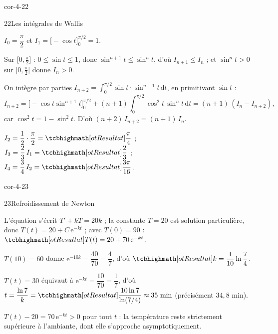 \begin{blocLivre}{cor-4-22}
\begin{corrige}{22}{Les intégrales de Wallis}
\begin{questions}
  \item $I_0=\dfrac{\pi}{2}$ et $I_1=\bigl[-\cos t\bigr]_0^{\pi/2}=1$.
  \item Sur $\bigl[0,\frac{\pi}{2}\bigr]$ : $0\leq\sin t\leq1$, donc
    $\sin^{n+1}t\leq\sin^{n}t$, d'où $I_{n+1}\leq I_n$ ; et $\sin^{n}t>0$
    sur $\bigl]0,\frac{\pi}{2}\bigr[$ donne $I_n>0$.
  \item On intègre par parties $I_{n+2}=\displaystyle\int_0^{\pi/2}\sin t\cdot\sin^{n+1}t\,\mathrm{d}t$,
    en primitivant $\sin t$ :
    \[
      I_{n+2}=\bigl[-\cos t\sin^{n+1}t\bigr]_0^{\pi/2}
      +(n+1)\int_0^{\pi/2}\cos^{2}t\,\sin^{n}t\,\mathrm{d}t
      =(n+1)\,(I_n-I_{n+2}),
    \]
    car $\cos^{2}t=1-\sin^{2}t$. D'où $(n+2)\,I_{n+2}=(n+1)\,I_n$.
  \item $I_2=\dfrac12\cdot\dfrac{\pi}{2}=\res{\dfrac{\pi}{4}}$ ;\quad
    $I_3=\dfrac23\,I_1=\res{\dfrac23}$ ;\quad
    $I_4=\dfrac34\,I_2=\res{\dfrac{3\pi}{16}}$.
\end{questions}
\end{corrige}
\end{blocLivre}

\begin{blocLivre}{cor-4-23}
\begin{corrige}{23}{Refroidissement de Newton}
\begin{questions}
  \item L'équation s'écrit $T'+kT=20k$ ; la constante $T=20$ est solution
    particulière, donc $T(t)=20+C\,\mathrm{e}^{-kt}$ ; avec $T(0)=90$ :
    $\res{T(t)=20+70\,\mathrm{e}^{-kt}}$.
  \item $T(10)=60$ donne $\mathrm{e}^{-10k}=\dfrac{40}{70}=\dfrac47$, d'où
    $\res{k=\dfrac{1}{10}\ln\dfrac74}$.
  \item $T(t)=30$ équivaut à $\mathrm{e}^{-kt}=\dfrac{10}{70}=\dfrac17$, d'où
    $t=\dfrac{\ln7}{k}=\res{\dfrac{10\ln7}{\ln(7/4)}\approx35\ \text{min}}$
    (précisément $34{,}8$ min).
  \item $T(t)-20=70\,\mathrm{e}^{-kt}>0$ pour tout $t$ : la température reste
    strictement supérieure à l'ambiante, dont elle s'approche
    asymptotiquement.
\end{questions}
\end{corrige}
\end{blocLivre}

